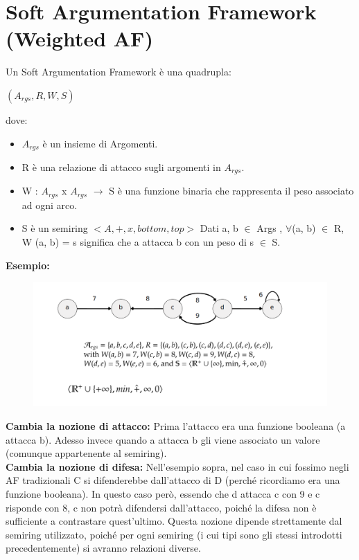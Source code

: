 \section{Soft Argumentation Framework (Weighted AF)}
Un Soft Argumentation Framework è una quadrupla:
\begin{center}
    $(A_{rgs} , R, W, S)$
\end{center}
dove:
\begin{itemize}
    \item $A_{rgs}$ è un insieme di Argomenti.
    \item R è una relazione di attacco sugli argomenti in $A_{rgs}$.
    \item W : $A_{rgs}$ x $A_{rgs}$ $\rightarrow$ S è una funzione binaria che
          rappresenta il peso associato ad ogni arco.
    \item S è un semiring $< A, +, x, bottom, top >$ Dati a, b $\in$ Args ,
          $\forall$(a, b) $\in$ R, W (a, b) = s significa che a attacca b con un peso
          di s $\in$ S.
\end{itemize}

\textbf{ Esempio:}
\begin{figure}[H]
    \centering
    \includegraphics[width=14cm, keepaspectratio]{img/Cap6/SoftA2.png}
\end{figure}

\textbf{Cambia la nozione di attacco:} Prima l'attacco era una funzione
booleana (a attacca b). Adesso invece quando a attacca b gli viene associato un
valore (comunque appartenente al semiring). \\\textbf{Cambia la nozione di
    difesa:} Nell'esempio sopra, nel caso in cui fossimo negli AF tradizionali C si
difenderebbe dall'attacco di D (perché ricordiamo era una funzione booleana). In
questo caso però, essendo che d attacca c con 9 e c risponde con 8, c non potrà
difendersi dall'attacco, poiché la difesa non è sufficiente a contrastare
quest'ultimo. Questa nozione dipende strettamente dal semiring utilizzato,
poiché per ogni semiring (i cui tipi sono gli stessi introdotti precedentemente)
si avranno relazioni diverse.

